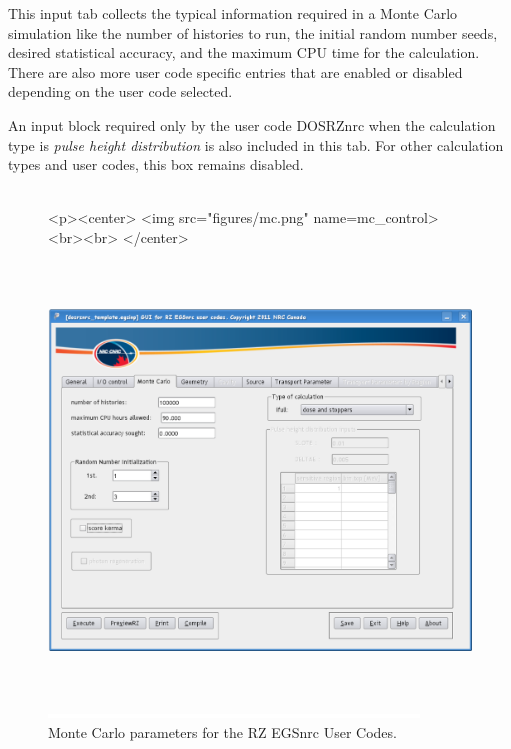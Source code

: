 \documentclass[12pt,twoside]{article}   %
\begin{document}
This input tab collects the typical information required in a Monte Carlo simulation like
the number of histories to run, the initial random number seeds, desired statistical accuracy,
and the maximum CPU time for the calculation. There are also more user code specific entries
that are enabled or disabled depending on the user code selected.

An input block required only by the user code DOSRZnrc when the calculation type is 
{\em pulse height distribution} is also included in this tab. For other calculation types and user codes,
this box remains disabled. \\ \\


\begin{figure}[htb]
\begin{htmlonly}
\begin{rawhtml}
<p><center>
<img src="figures/mc.png" name=mc_control><br><br>
</center>
\end{rawhtml}
\end{htmlonly}
\begin{latexonly}
\begin{center}
\includegraphics[height=11.56cm]{figures/mc}
\end{center}
\end{latexonly}
\begin{center}
\includegraphics[height=1mm]{figures/fake2}
\end{center}
\caption{Monte Carlo parameters for the RZ EGSnrc User Codes.}
\label{mc_control}
\end{figure}
\end{document}
